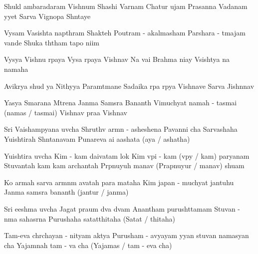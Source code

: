 \documentclass[20pt]{article}
\begin{document}


\SlokaHuge
{Shukl{\A} ambaradaram Vishnum} {Shashi Varnam Chatur {\Bh}ujam}
{Prasanna Vadanam {\Dh}y{\A}yet} {Sarva Vignopa Sh{\A}ntaye}

\phantom{\countr}
\SlokaHuge
{Vy{\A}sam Vasishta napth{\A}ram} {Shakteh Poutram - akalmasham}
{Par{\A}shara - {\A}tmajam vande} {Shuka th{\A}tham tapo ni{\dhh}im}

\SlokaHuge
{Vy{\A}s{\A}ya Vishnu r{\oo}paya} {Vy{\A}sa r{\oo}paya Vishnav{\e}} 
{Na{\mo} vai Brahma ni{\dhh}ay{\e}} {V{\aaa}sisht{\A}ya na{\mo} namaha}

\newpage 

\SlokaHuge
{Avik{\A}r{\A}ya shud{\dhh} {\A}ya} {Nithy{\A}ya Param{\A}tmane} 
{Sadaika r{\oo}pa r{\oo}p{\A}ya} {Vishnave Sarva Jishnnav{\e}}

\SlokaHuge
{Yasya Smarana M{\A}trena} {Janma Sams{\A}ra Ban{\dhh}an{\A}th} 
{Vimuchyat{\e} namah - tasmai (namas / tasmai)} {Vishnav{\e} pra{\bh}a Vishnav{\e}}


\SlokaHeaderHuge
{Sri Vaishamp{\A}yana uv{\A}cha}
{Shruthv{\A} {\Dh}arm{\A}n - asheshena} {Pavan{\A}ni cha Sarvashaha}
{Yu{\dhh}ishtirah Sh{\A}ntanavam} {Punareva \dsh a{\bh}i \dsh a{\bh}ashata (a{\bh}ya / {\bh}ashatha)}

\newpage

\SlokaHeaderHuge
 {Yu{\dhh}ishtira uv{\A}cha}
{Kim - {\e}kam daivatam lok{\e}} {Kim v{\A}pi - {\e}kam (v{\A}py{\e} / kam) par{\A}yanam}
{Stuvantah kam kam \dsh archantah} {Pr{\A}pnuyuh \dsh manav{\ah} (Prapnuyur / manav{\ah}) shu{\bh}am}

\SlokaHuge
{Ko {\Dh}armah sarva {\Dh}arm{\A}n{\aaa}m} {{\bh}avatah para{\mo} mataha} 
{Kim japan - muchyat{\e} jantuhu} {Janma sams{\A}ra ban{\dhh}an{\A}th (jantur / janma)}

\SlokaHeaderHuge
{Sri {\Bh}eeshma uv{\A}cha}
{Jagat pra{\bh}um d{\e}va d{\e}vam} {Anantham purush{\oh}ttamam} 
{Stuvan - n{\A}ma sahasr{\e}na} {Purushaha satat{\oh}thitaha (Satat{\oh} / thitaha)}

\newpage

\SlokaHuge
{Tam-eva ch{\aaa}rchayan - nityam} {{\Bh}aktya Purusham - avyayam}
{{\Dh}y{\A}yan stuvan namasyan \dsh cha} {Yajam{\aaa}nah tam - {\e}va cha (Yajam{\an}as / tam - eva cha)}
\end{document}
